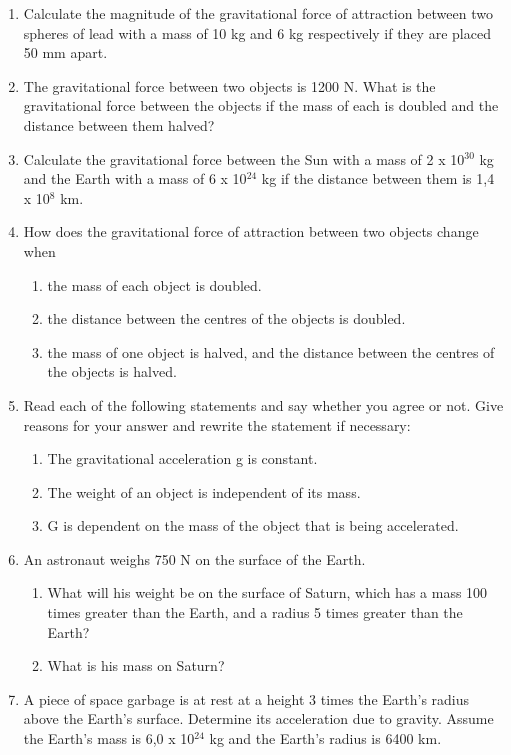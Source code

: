 \begin{eocexercises}{}
\begin{enumerate}
\item {Calculate the magnitude of the gravitational force of attraction between two spheres of lead with a mass of 10 kg and 6 kg respectively if they are placed 50 mm apart.}

\item {The gravitational force between two objects is 1200 N.  What is the gravitational force between the objects if the mass of each is doubled and the distance between them halved?	}

\item {Calculate the gravitational force between the Sun with a mass of 2 x 10$^{30}$ kg and the Earth with a mass of 6 x 10$^{24}$ kg if the distance between them is 1,4 x 10$^8$ km.	}

\item {How does the gravitational force of attraction between two objects change when
\begin{enumerate}
\item the mass of each object is doubled.
\item the distance between the centres of the objects is doubled.
\item the mass of one object is halved, and the distance between the centres of the objects is halved.
\end{enumerate}}

\item {Read each of the following statements and say whether you agree or not. Give reasons for your answer and rewrite the statement if necessary:
\begin{enumerate}
\item The gravitational acceleration g is constant.
\item The weight of an object is independent of its mass.
\item G is dependent on the mass of the object that is being accelerated.
\end{enumerate}}

\item {An astronaut weighs 750 N on the surface of the Earth.
\begin{enumerate}
\item What will his weight be on the surface of Saturn, which has a mass 100 times greater than the Earth, and a radius 5 times greater than the Earth?
\item What is his mass on Saturn?
\end{enumerate}
}

\item {A piece of space garbage is at rest at a height 3 times the Earth's radius above the Earth's surface.  Determine its acceleration due to gravity. Assume the Earth's mass is 6,0 x 10$^{24}$ kg and the Earth's radius is 6400 km.}


\end{enumerate}
\end{eocexercises}
